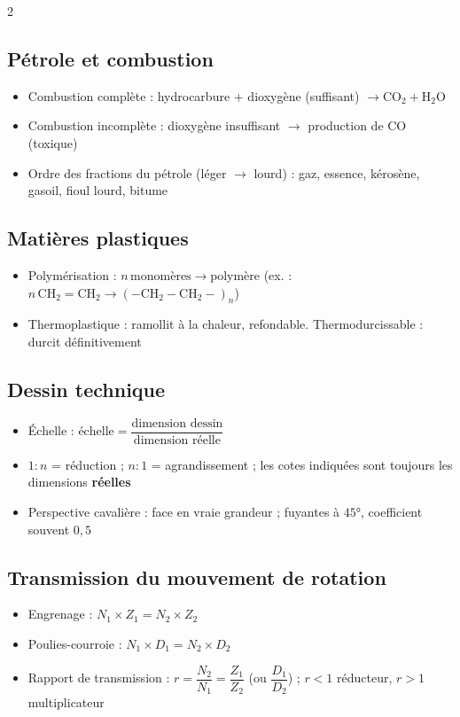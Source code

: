 \begin{multicols}{2}
\subsection*{\color{onbo}Pétrole et combustion}
\begin{itemize}
\item Combustion complète : hydrocarbure $+$ dioxygène (suffisant) $\to\mathrm{CO_2}+
\mathrm{H_2O}$
\item Combustion incomplète : dioxygène insuffisant $\to$ production de CO (toxique)
\item Ordre des fractions du pétrole (léger $\to$ lourd) : gaz, essence, kérosène, gasoil,
fioul lourd, bitume
\end{itemize}

\subsection*{\color{onbo}Matières plastiques}
\begin{itemize}
\item Polymérisation : $n\,\text{monomères}\longrightarrow\text{polymère}$ (ex. :
$n\,\mathrm{CH_2\!=\!CH_2}\to\mathrm{(-CH_2-CH_2-)}_n$)
\item Thermoplastique : ramollit à la chaleur, refondable. Thermodurcissable : durcit
définitivement
\end{itemize}

\subsection*{\color{onbo}Dessin technique}
\begin{itemize}
\item Échelle : $\text{échelle}=\dfrac{\text{dimension dessin}}{\text{dimension réelle}}$
\item $1{:}n$ = réduction ; $n{:}1$ = agrandissement ; les cotes indiquées sont toujours
les dimensions \textbf{réelles}
\item Perspective cavalière : face en vraie grandeur ; fuyantes à $45°$, coefficient
souvent $0{,}5$
\end{itemize}

\subsection*{\color{onbo}Transmission du mouvement de rotation}
\begin{itemize}
\item Engrenage : $N_1\times Z_1=N_2\times Z_2$
\item Poulies-courroie : $N_1\times D_1=N_2\times D_2$
\item Rapport de transmission : $r=\dfrac{N_2}{N_1}=\dfrac{Z_1}{Z_2}$ (ou
$\dfrac{D_1}{D_2}$) ; $r<1$ réducteur, $r>1$ multiplicateur
\end{itemize}


\end{multicols}
